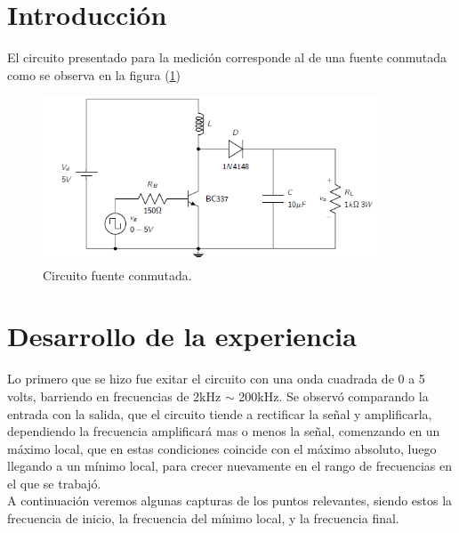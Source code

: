 

\usepackage{float}
\usepackage[caption = false]{subfig}










\section{Introducción}
El circuito presentado para la medición corresponde al de una fuente conmutada como se observa en la figura (\ref{fig:fcon})
\begin{figure}[H]
	\centering
	\includegraphics[width=0.9\textwidth]{Imagenes/circ.png}
\caption{Circuito fuente conmutada.}
	\label{fig:fcon}
\end{figure}

\section{Desarrollo de la experiencia}
Lo primero que se hizo fue exitar el circuito con una onda cuadrada de 0 a 5 volts, barriendo en frecuencias de 2kHz $\sim$ 200kHz.
Se observó comparando la entrada con la salida, que el circuito tiende a rectificar la señal y amplificarla, dependiendo la frecuencia amplificará mas o menos la señal, comenzando en un máximo local, que en estas condiciones coincide con el máximo absoluto, luego llegando a un mínimo local, para crecer nuevamente en el rango de frecuencias en el que se trabajó.\\
A continuación veremos algunas capturas de los puntos relevantes, siendo estos la frecuencia de inicio, la frecuencia del mínimo local, y la frecuencia final.

